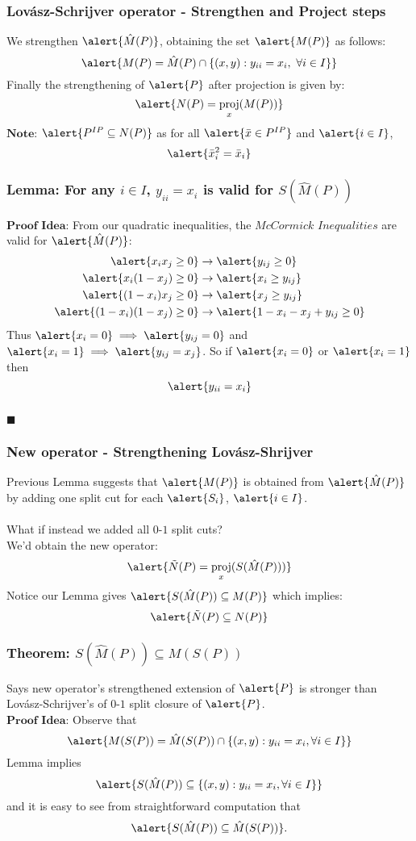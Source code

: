 \documentclass{beamer}
\DeclareMathOperator{\proj}{proj}
\begin{document}
\begin{frame}
\frametitle{Lov\'asz-Schrijver operator - Strengthen and Project steps}
We strengthen $\alert{\hat{M}(P)}$, obtaining the set $\alert{M(P)}$ as follows:
$$\alert{M(P) = \hat{M}(P) \cap \{ (x,y) : y_{ii} = x_{i},\ \forall i \in I\} } $$
Finally the strengthening of $\alert{P}$ after projection is given by:
$$\alert{N(P) = \proj_x(M(P))}$$
$\textbf{Note:}$ $\alert{P^{IP} \subseteq N(P)}$ as for all $\alert{\bar{x} \in P^{IP}}$ and $\alert{i \in I}$, 
$$\alert{\bar{x}_i^2 = \bar{x}_i}$$
\end{frame}

\begin{frame}
\frametitle{Lemma: For any $i\in I$, $y_{ii} = x_{i}$ is valid for $S(\hat{M}(P))$} 
$\textbf{Proof Idea:}$ From our quadratic inequalities, the $\textit{McCormick Inequalities}$ are valid for $\alert{\hat{M}(P)}$:
\begin{align*}
\alert{x_i x_j \geq 0} & \rightarrow \alert{y_{ij} \geq 0} \\
\alert{x_i(1-x_j)\geq 0} & \rightarrow \alert{x_i \geq y_{ij}} \\
\alert{(1-x_i)x_j \geq 0} & \rightarrow \alert{x_j \geq y_{ij}} \\
\alert{(1-x_i)(1-x_j) \geq 0} & \rightarrow \alert{1 - x_i - x_j + y_{ij}  \geq 0}
\end{align*}
Thus $\alert{x_i = 0} \implies \alert{y_{ij} = 0}$ and $\alert{x_i = 1} \implies \alert{y_{ij} = x_j}$. So if $\alert{x_i = 0}$ or $\alert{x_i = 1}$ then
$$\alert{y_{ii} = x_i}$$ \\$\blacksquare$
\end{frame}

\begin{frame}
\frametitle{New operator - Strengthening Lov\'asz-Shrijver}
Previous Lemma suggests that $\alert{M(P)}$ is obtained from $\alert{\hat{M}(P)}$ by adding one split cut for each $\alert{S_i}$, $\alert{i \in I}$.\\\ \\
What if instead we added all $0$-$1$ split cuts?\\
We'd obtain the new operator:
$$\alert{\tilde{N}(P) = \proj_x(S(\hat{M}(P)))}$$
Notice our Lemma gives $\alert{S(\hat{M}(P)) \subseteq M(P)}$ which implies:
$$\alert{\tilde{N}(P) \subseteq N(P)}$$
\end{frame}

\begin{frame}
\frametitle{Theorem: $S(\hat{M}(P)) \subseteq M(S(P))$}
Says new operator's strengthened extension of $\alert{P}$ is stronger than Lov\'asz-Schrijver's of $0$-$1$ split closure of $\alert{P}$.
\\$\textbf{Proof Idea:}$ Observe that $$\alert{M(S(P)) = \hat{M}(S(P)) \cap \{(x,y):y_{ii} = x_i, \forall i \in I\}}$$
Lemma implies $$\alert{S(\hat{M}(P)) \subseteq \{(x,y):y_{ii}=x_i, \forall i \in I \}}$$  and it is easy to see from straightforward computation that $$\alert{S(\hat{M}(P)) \subseteq \hat{M}(S(P))}.$$ 
\end{frame}
\end{document}
